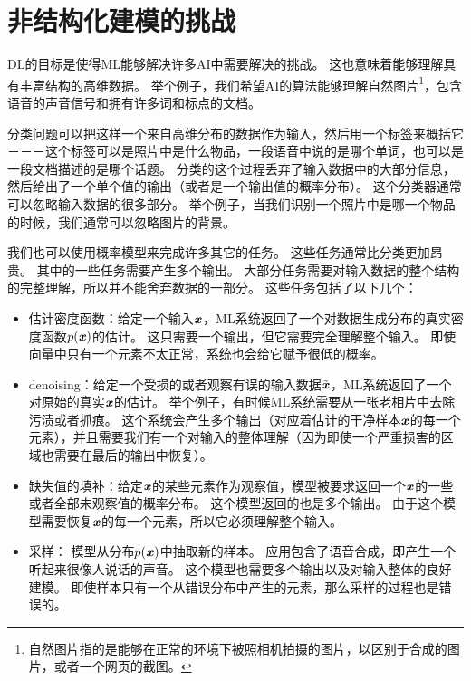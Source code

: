 \section{非结构化建模的挑战}
\label{sec:the_challenge_of_unstructured_modelling}


\gls{DL}的目标是使得\gls{ML}能够解决许多\gls{AI}中需要解决的挑战。
这也意味着能够理解具有丰富结构的高维数据。
举个例子，我们希望\gls{AI}的算法能够理解自然图片\footnote{自然图片指的是能够在正常的环境下被照相机拍摄的图片，以区别于合成的图片，或者一个网页的截图。}，包含语音的声音信号和拥有许多词和标点的文档。


分类问题可以把这样一个来自高维分布的数据作为输入，然后用一个标签来概括它－－－这个标签可以是照片中是什么物品，一段语音中说的是哪个单词，也可以是一段文档描述的是哪个话题。
分类的这个过程丢弃了输入数据中的大部分信息，然后给出了一个单个值的输出（或者是一个输出值的概率分布）。
这个分类器通常可以忽略输入数据的很多部分。
举个例子，当我们识别一个照片中是哪一个物品的时候，我们通常可以忽略图片的背景。


我们也可以使用概率模型来完成许多其它的任务。
这些任务通常比分类更加昂贵。
其中的一些任务需要产生多个输出。
大部分任务需要对输入数据的整个结构的完整理解，所以并不能舍弃数据的一部分。
这些任务包括了以下几个：
\begin{itemize}
	\item 估计密度函数：给定一个输入$\boldsymbol{\mathit{x}}$，\gls{ML}系统返回了一个对数据生成分布的真实密度函数$p(\boldsymbol{\mathit{x}})$的估计。
	这只需要一个输出，但它需要完全理解整个输入。
	即使向量中只有一个元素不太正常，系统也会给它赋予很低的概率。
	
	
	\item \gls{denoising}：给定一个受损的或者观察有误的输入数据$\tilde{\boldsymbol{\mathit{x}}}$，\gls{ML}系统返回了一个对原始的真实$\boldsymbol{\mathit{x}}$的估计。
	举个例子，有时候\gls{ML}系统需要从一张老相片中去除污渍或者抓痕。
	这个系统会产生多个输出（对应着估计的干净样本$\boldsymbol{\mathit{x}}$的每一个元素），并且需要我们有一个对输入的整体理解（因为即使一个严重损害的区域也需要在最后的输出中恢复）。
	
	\item 缺失值的填补：给定$\boldsymbol{\mathit{x}}$的某些元素作为观察值，模型被要求返回一个$\boldsymbol{\mathit{x}}$的一些或者全部未观察值的概率分布。
	这个模型返回的也是多个输出。
	由于这个模型需要恢复$\boldsymbol{\mathit{x}}$的每一个元素，所以它必须理解整个输入。
	
	\item 采样： 模型从分布$p(\boldsymbol{\mathit{x}})$中抽取新的样本。
	应用包含了语音合成，即产生一个听起来很像人说话的声音。
	这个模型也需要多个输出以及对输入整体的良好建模。
	即使样本只有一个从错误分布中产生的元素，那么采样的过程也是错误的。 
\end{itemize}

